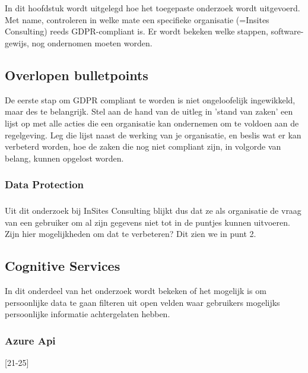 
\chapter{}
\label{ch:methodologie}

In dit hoofdstuk wordt uitgelegd hoe het toegepaste onderzoek wordt uitgevoerd. Met name, controleren in welke mate een specifieke organisatie (=Insites Consulting) reeds GDPR-compliant is. Er wordt bekeken welke stappen, software-gewijs, nog ondernomen moeten worden. 



\section{Overlopen bulletpoints}
De eerste stap om GDPR compliant te worden is niet ongeloofelijk ingewikkeld, maar des te belangrijk. Stel aan de hand van de uitleg in 'stand van zaken' een lijst op met alle acties die een organisatie kan ondernemen om te voldoen aan de regelgeving. Leg die lijst naast de werking van je organisatie, en beslis wat er kan verbeterd worden, hoe de zaken die nog niet compliant zijn, in volgorde van belang, kunnen opgelost worden.  

\subsection{Data Protection}


\subsection{}
Uit dit onderzoek bij InSites Consulting blijkt dus dat ze als organisatie de vraag van een gebruiker om al zijn gegevens niet tot in de puntjes kunnen uitvoeren. Zijn hier mogelijkheden om dat te verbeteren? Dit zien we in punt 2. 

\section{Cognitive Services}
In dit onderdeel van het onderzoek wordt bekeken of het mogelijk is om persoonlijke data te gaan filteren uit open velden waar gebruikers mogelijks persoonlijke informatie achtergelaten hebben. 

\subsection{Azure Api }

[21-25]

